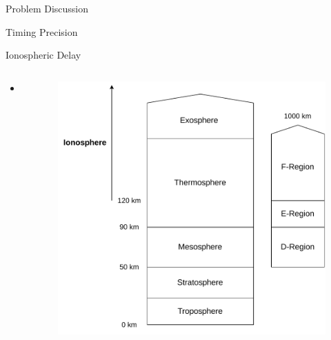 %
%
%
%
%

%
%
%
%
%

\begin{frame}{Problem Discussion}


\end{frame}

\begin{frame}{Timing Precision}


\end{frame}

\begin{frame}{Ionospheric Delay}

    \begin{columns}[t]
        \begin{column}[t]{0.5\textwidth}
            \begin{itemize}
                \item .
            \end{itemize}
        \end{column}
        \begin{column}[t]{0.5\textwidth}
            \begin{figure}[!ht]
                \begin{center}
                    \includegraphics[width=\columnwidth]{figures/atmosphere-model}
                \end{center}
            \end{figure}
        \end{column}
    \end{columns}

\end{frame}

